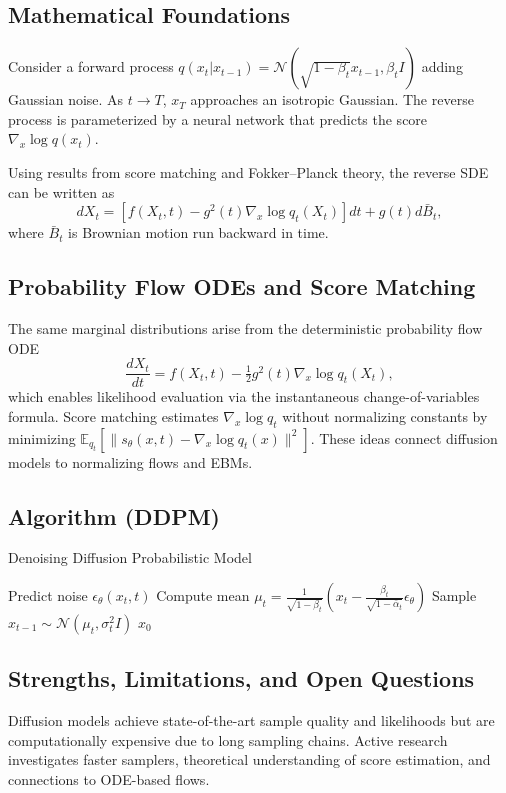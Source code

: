 \subsection{Mathematical Foundations}
Consider a forward process $q(x_t|x_{t-1})=\mathcal{N}(\sqrt{1-\beta_t}x_{t-1},\beta_t I)$ adding Gaussian noise. As $t\to T$, $x_T$ approaches an isotropic Gaussian. The reverse process is parameterized by a neural network that predicts the score $\nabla_x \log q(x_t)$.

Using results from score matching \cite{hyvarinen2005} and Fokker--Planck theory, the reverse SDE can be written as
\begin{equation}
dX_t = \left[f(X_t,t) - g^2(t)\nabla_x \log q_t(X_t)\right]dt + g(t)d\bar{B}_t,
\end{equation}
where $\bar{B}_t$ is Brownian motion run backward in time.

\subsection{Probability Flow ODEs and Score Matching}
The same marginal distributions arise from the deterministic probability flow ODE
\begin{equation}
\frac{dX_t}{dt}=f(X_t,t)-\tfrac12 g^2(t)\nabla_x \log q_t(X_t),
\end{equation}
which enables likelihood evaluation via the instantaneous change-of-variables formula. Score matching estimates $\nabla_x\log q_t$ without normalizing constants by minimizing $\mathbb{E}_{q_t}[\|s_\theta(x,t)-\nabla_x\log q_t(x)\|^2]$. These ideas connect diffusion models to normalizing flows and EBMs.

\subsection{Algorithm (DDPM)}
\begin{algorithm}
\caption{Denoising Diffusion Probabilistic Model}
\begin{algorithmic}[1]
    \STATE Predict noise $\epsilon_\theta(x_t,t)$
    \STATE Compute mean $\mu_t=\frac{1}{\sqrt{1-\beta_t}}(x_t-\frac{\beta_t}{\sqrt{1-\bar{\alpha}_t}}\epsilon_\theta)$
    \STATE Sample $x_{t-1}\sim\mathcal{N}(\mu_t,\sigma_t^2 I)$
\ENDFOR
\RETURN $x_0$
\end{algorithmic}
\end{algorithm}

\subsection{Strengths, Limitations, and Open Questions}
Diffusion models achieve state-of-the-art sample quality and likelihoods but are computationally expensive due to long sampling chains. Active research investigates faster samplers, theoretical understanding of score estimation, and connections to ODE-based flows.

